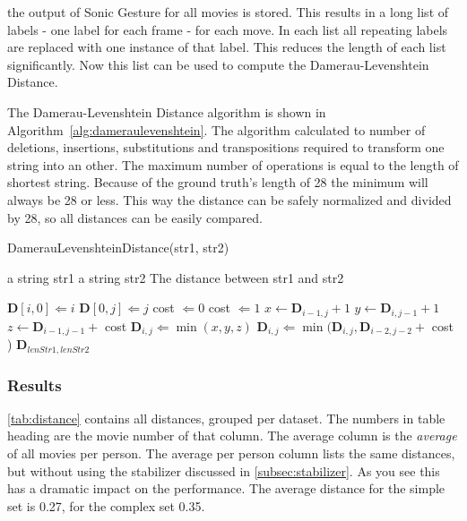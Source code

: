 the output of Sonic Gesture for all movies is stored. This results in a long list of labels - one label for each frame - for each move. In each list all repeating labels are replaced with one instance of that label. This reduces the length of each list significantly. Now this list can be used to compute the Damerau-Levenshtein Distance.

The Damerau-Levenshtein Distance algorithm is shown in Algorithm~\autoref{alg:dameraulevenshtein}. The algorithm calculated to number of deletions, insertions, substitutions and transpositions required to transform one string into an other. The maximum number of operations is equal to the length of shortest string. Because of the ground truth's length of 28 the minimum will always be 28 or less. This way the distance can be safely normalized and divided by 28, so all distances can be easily compared.

\begin{algorithm}
\caption{DamerauLevenshteinDistance(str1, str2)}
\label{alg:dameraulevenshtein}
\begin{algorithmic}
   \REQUIRE a string str1
   \REQUIRE a string str2
   \ENSURE The distance between str1 and str2

   \medskip

       \STATE $\mathbf{D}[i, 0] \Leftarrow i$
   \ENDFOR
       \STATE $\mathbf{D}[0, j] \Leftarrow j$
   \ENDFOR
				\STATE cost $\Leftarrow 0$
            \ELSE
				\STATE cost $\Leftarrow 1$
			\ENDIF
			\STATE $x \leftarrow \mathbf{D}_{i-1, j  } + 1$ %
			\STATE $y \leftarrow \mathbf{D}_{i  , j-1} + 1$ %
            \STATE $z \leftarrow \mathbf{D}_{i-1, j-1} + $ cost %
            \STATE $\mathbf{D}_{i, j} \Leftarrow \min(x, y, z)$
				\STATE $\mathbf{D}_{i, j} \Leftarrow \min(
                	\mathbf{D}_{i, j},
                    \mathbf{D}_{i-2, j-2} + $ cost  %
                )
			\ENDIF
		\ENDFOR
	\ENDFOR
   \RETURN $\mathbf{D}_{lenStr1, lenStr2}$

\end{algorithmic}
\end{algorithm}
	
\subsubsection{Results}
\autoref{tab:distance} contains all distances, grouped per dataset. The numbers in table heading are the movie number of that column. The average column is the \textit{average} of all movies per person. The average per person column lists the same distances, but without using the stabilizer discussed in \autoref{subsec:stabilizer}. As you see this has a dramatic impact on the performance. The average distance for the simple set is 0.27, for the complex set 0.35. 



